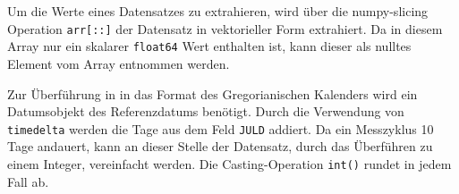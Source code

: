     Um die Werte eines Datensatzes zu extrahieren, wird über die numpy-slicing Operation \texttt{arr[::]} der Datensatz in vektorieller Form extrahiert. Da in diesem Array nur ein skalarer \texttt{float64} Wert enthalten ist, kann dieser als nulltes Element vom Array entnommen werden.
    
    Zur Überführung in in das Format des Gregorianischen Kalenders wird ein Datumsobjekt des Referenzdatums benötigt. Durch die Verwendung von \texttt{timedelta} werden die Tage aus dem Feld \texttt{JULD} addiert. Da ein Messzyklus 10 Tage andauert, kann an dieser Stelle der Datensatz, durch das Überführen zu einem Integer, vereinfacht werden. Die Casting-Operation \texttt{int()} rundet in jedem Fall ab.
    
        

 
   

